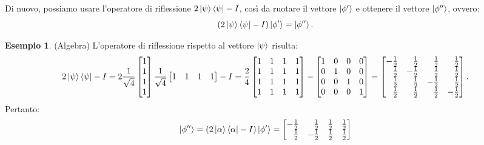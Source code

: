 \documentclass{book}
\theoremstyle{definition}
\theoremstyle{definition}
\theoremstyle{definition}
\newtheorem*{ex}{Esempio}
\theoremstyle{plain}
\theoremstyle{plain}
\theoremstyle{plain}
\theoremstyle{plain}
\begin{document}
Di nuovo, possiamo usare l'operatore di riflessione $2\ket{\psi}\bra{\psi}-I$, così da ruotare il vettore $\ket{\phi'}$ e ottenere il vettore $\ket{\phi''}$, ovvero:
\begin{displaymath}
(2\ket{\psi}\bra{\psi}-I) \ket{\phi'} = \ket{\phi''}.
\end{displaymath}
\begin{ex}
(Algebra) L'operatore di riflessione rispetto al vettore $\ket{\psi}$ risulta:
\begin{displaymath}
2\ket{\psi}\bra{\psi} - I = 2 \frac{1}{\sqrt{4}}\begin{bmatrix}
1 \\
1 \\
1 \\
1
\end{bmatrix}
\frac{1}{\sqrt{4}} \begin{bmatrix}
1 & 1 & 1 & 1 \\
\end{bmatrix}
- I = \frac{2}{4} \begin{bmatrix}
1 & 1 & 1 & 1 \\
1 & 1 & 1 & 1 \\
1 & 1 & 1 & 1 \\
1 & 1 & 1 & 1 
\end{bmatrix}
- \begin{bmatrix}
1 & 0 & 0 & 0 \\
0 & 1 & 0 & 0 \\
0 & 0 & 1 & 0 \\
0 & 0 & 0 & 1 \\
\end{bmatrix} = \begin{bmatrix*}[r]
-\frac{1}{2} & \frac{1}{2} & \frac{1}{2} & \frac{1}{2} \\
\frac{1}{2} & -\frac{1}{2} & \frac{1}{2} & \frac{1}{2} \\
\frac{1}{2} & \frac{1}{2} & -\frac{1}{2} & \frac{1}{2} \\
\frac{1}{2} & \frac{1}{2} & \frac{1}{2} & -\frac{1}{2} \\
\end{bmatrix*}.
\end{displaymath}
Pertanto:
\begin{displaymath}
\ket{\phi''} = (2\ket{\alpha}\bra{\alpha}-I) \ket{\phi'} = 
\begin{bmatrix*}[r]
-\frac{1}{2} & \frac{1}{2} & \frac{1}{2} & \frac{1}{2} \\
\frac{1}{2} & -\frac{1}{2} & \frac{1}{2} & \frac{1}{2} \\

\end{bmatrix*}
\end{displaymath}
\end{ex}
\end{document}
